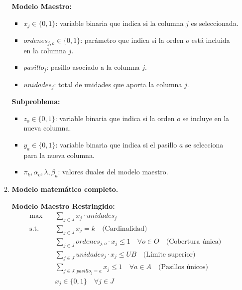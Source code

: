 \documentclass[a4paper,12pt]{article}
\begin{document}
\begin{enumerate}[label=(\alph*), leftmargin=2em]
\begin{enumerate}[label=\roman*., leftmargin=0.2em]
            \textbf{Modelo Maestro:}
            \begin{itemize}
                \item $x_j \in \{0,1\}$: variable binaria que indica si la columna $j$ es seleccionada.
                \item $ordenes_{j,o} \in \{0,1\}$: parámetro que indica si la orden $o$ está incluida en la columna $j$.
                \item $pasillo_j$: pasillo asociado a la columna $j$.
                \item $unidades_j$: total de unidades que aporta la columna $j$.
            \end{itemize}

            \textbf{Subproblema:}
            \begin{itemize}
                \item $z_o \in \{0,1\}$: variable binaria que indica si la orden $o$ se incluye en la nueva columna.
                \item $y_a \in \{0,1\}$: variable binaria que indica si el pasillo $a$ se selecciona para la nueva columna.
                \item $\pi_k, \alpha_o, \lambda, \beta_a$: valores duales del modelo maestro.
            \end{itemize}

        \item \textbf{Modelo matemático completo.}

            \textbf{Modelo Maestro Restringido:}
            \[
            \begin{aligned}
            \max \quad & \sum_{j \in J} x_j \cdot unidades_j \\
            \text{s.t.} \quad
            & \sum_{j \in J} x_j = k \quad \text{(Cardinalidad)} \\
            & \sum_{j \in J} ordenes_{j,o} \cdot x_j \leq 1 \quad \forall o \in O \quad \text{(Cobertura única)} \\
            & \sum_{j \in J} unidades_j \cdot x_j \leq UB \quad \text{(Límite superior)} \\
            & \sum_{j \in J: pasillo_j = a} x_j \leq 1 \quad \forall a \in A \quad \text{(Pasillos únicos)} \\
            & x_j \in \{0,1\} \quad \forall j \in J
            \end{aligned}
            \]


\end{enumerate}
\end{enumerate}
\end{document}
